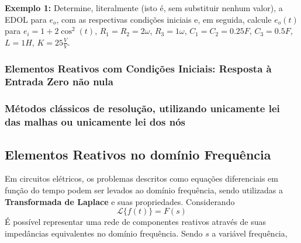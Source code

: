 \documentclass{article}
\numberwithin{equation}{section}
\begin{document}
\noindent\textbf{Exemplo 1: }Determine, literalmente (isto é, sem substituir nenhum valor), a EDOL para $e_o$, com as respectivas condições iniciais e, em seguida, calcule $e_o(t)$ para $e_i= 1 + 2\cos^2(t)$, $R_1 = R_2 = 2\omega$, $R_3=1\omega$, $C_1 = C_2 = 0.25F$, $C_3 = 0.5F$, $L=1H$, $K = 25 \frac{V}{V}$.

\begin{center}
\end{center}

\subsubsection{Elementos Reativos com Condições Iniciais: Resposta à Entrada Zero não nula}
\label{subsubsec:entradazeronaonula}

\subsubsection{Métodos clássicos de resolução, utilizando unicamente lei das malhas ou unicamente lei dos nós}
\label{subsubsec:classicos}

\subsection{Elementos Reativos no domínio Frequência}
\label{subesc:frequencia}
Em circuitos elétricos, os problemas descritos como equações diferenciais em função do tempo podem ser levados ao domínio frequência, sendo utilizadas a \textbf{Transformada de Laplace} e suas propriedades. Considerando
$$\mathscr{L}\{f(t)\}=F(s)$$
É possível representar uma rede de componentes reativos através de suas impedâncias equivalentes no domínio frequência. Sendo $s$ a variável frequência,
\end{document}
